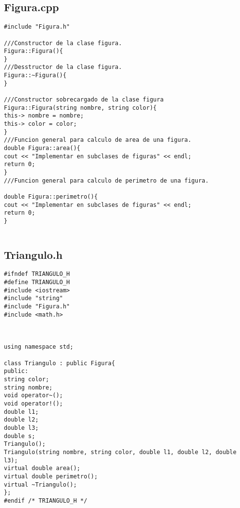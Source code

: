 \documentclass[11pt]{article}
\begin{document}
\subsection{Figura.cpp}
\begin{lstlisting}
#include "Figura.h"

///Constructor de la clase figura.
Figura::Figura(){
}
///Desstructor de la clase figura.
Figura::~Figura(){
}

///Constructor sobrecargado de la clase figura
Figura::Figura(string nombre, string color){
this-> nombre = nombre;
this-> color = color;
}
///Funcion general para calculo de area de una figura.
double Figura::area(){
cout << "Implementar en subclases de figuras" << endl;
return 0;
}
///Funcion general para calculo de perimetro de una figura.

double Figura::perimetro(){
cout << "Implementar en subclases de figuras" << endl;
return 0;
}


\end{lstlisting}

\subsection{Triangulo.h}
\begin{lstlisting}
#ifndef TRIANGULO_H
#define TRIANGULO_H
#include <iostream>
#include "string"
#include "Figura.h"
#include <math.h> 



using namespace std;

class Triangulo : public Figura{
public:
string color;
string nombre;
void operator~();
void operator!();
double l1;
double l2;
double l3;
double s;
Triangulo();
Triangulo(string nombre, string color, double l1, double l2, double l3);
virtual double area();
virtual double perimetro();
virtual ~Triangulo();
};
#endif /* TRIANGULO_H */
\end{lstlisting}
\end{document}
